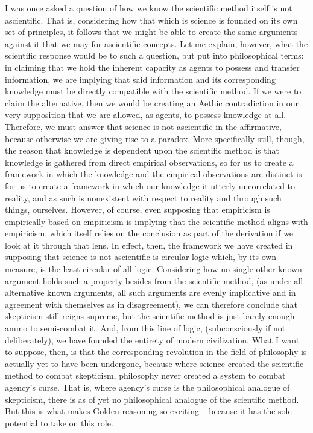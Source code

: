 I was once asked a question of how we know the scientific method itself is not ascientific. That is, considering how that which is science is founded on its own set of principles, it follows that we might be able to create the same arguments against it that we may for ascientific concepts. Let me explain, however, what the scientific response would be to such a question, but put into philosophical terms: in claiming that we hold the inherent capacity as agents to possess and transfer information, we are implying that said information and its corresponding knowledge must be directly compatible with the scientific method. If we were to claim the alternative, then we would be creating an Aethic contradiction in our very supposition that we are allowed, as agents, to possess knowledge at all. Therefore, we must answer that science is not ascientific in the affirmative, because otherwise we are giving rise to a paradox. More specifically still, though, the reason that knowledge is dependent upon the scientific method is that knowledge is gathered from direct empirical observations, so for us to create a framework in which the knowledge and the empirical observations are distinct is for us to create a framework in which our knowledge it utterly uncorrelated to reality, and as such is nonexistent with respect to reality and through such things, ourselves. However, of course, even supposing that empiricism is empirically based on empiricism is implying that the scientific method aligns with empiricism, which itself relies on the conclusion as part of the derivation if we look at it through that lens. In effect, then, the framework we have created in supposing that science is not ascientific is circular logic which, by its own measure, is the least circular of all logic. Considering how no single other known argument holds such a property besides from the scientific method, (as under all alternative known arguments, all such arguments are evenly implicative and in agreement with themselves as in disagreement), we can therefore conclude that skepticism still reigns supreme, but the scientific method is just barely enough ammo to semi-combat it. And, from this line of logic, (subconsciously if not deliberately), we have founded the entirety of modern civilization. What I want to suppose, then, is that the corresponding revolution in the field of philosophy is actually yet to have been undergone, because where science created the scientific method to combat skepticism, philosophy never created a system to combat agency’s curse. That is, where agency’s curse is the philosophical analogue of skepticism, there is as of yet no philosophical analogue of the scientific method. But this is what makes Golden reasoning so exciting – because it has the sole potential to take on this role. 


